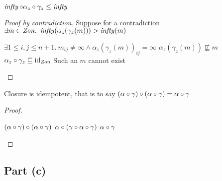 \begin{lemma}\label{lemma:infty-closure}
  $\operatorname{\mathit{infty}}\circ\alpha_z\circ\gamma_z\leq\operatorname{\mathit{infty}}$
  \begin{proof}[Proof by contradiction]
    Suppose for a contradiction ${\exists m\in\mathit{Zon}.~\operatorname{\mathit{infty}}(\alpha_z(\gamma_z(m))) > \operatorname{\mathit{infty}}(m)}$
    \begin{itemize}
      \step[\imps] $\exists1\leq i, j\leq n+1.~m_{ij}\neq\infty\wedge\alpha_z(\gamma_z(m))_{ij} = \infty$
      \step[\imps] $\alpha_z(\gamma_z(m))\not\sqsubseteq m$
      \step[\contras] $\alpha_z\circ\gamma_z\sqsubseteq\operatorname{id}_{\mathit{Zon}}$
      \step[\imps] Such an $m$ cannot exist\qedhere
    \end{itemize}
  \end{proof}
\end{lemma}

\begin{lemma}\label{lemma:closure-idemp}
  Closure is idempotent, that is to say
  ${(\alpha\circ\gamma)\circ(\alpha\circ\gamma) = \alpha\circ\gamma}$
  \begin{proof}~\\
    \begin{itemize}
      \step $(\alpha\circ\gamma)\circ(\alpha\circ\gamma)$
      \step[=] $\alpha\circ(\gamma\circ\alpha\circ\gamma)$
      \step[=] $\alpha\circ\gamma$\qedhere
    \end{itemize}
  \end{proof}
\end{lemma}

\subsection{Part (c)}\label{sec:q-1-c}

